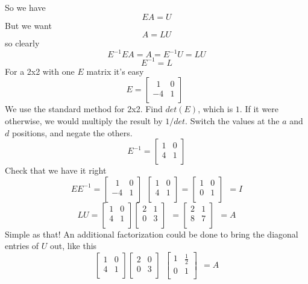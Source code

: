 \documentclass[11pt, oneside]{article}
\begin{document}
So we have 
\[ EA = U \]
But we want
\[ A = LU \]
so clearly 
\[ E^{-1}EA = A = E^{-1}U = LU \]
\[ E^{-1} = L \]
For a 2x2 with one $E$ matrix it's easy
\[ 
E  =
\begin{bmatrix} 
\ \   1  &  0  \\ 
  -4  &  1  \\
\end{bmatrix}  \ \ 
\]
We use the standard method for 2x2.  Find $det(E)$, which is $1$.  If it were otherwise, we would multiply the result by $1/det$.  Switch the values at the $a$ and $d$ positions, and negate the others.
\[ 
E^{-1} =
\begin{bmatrix} 
  1  &  0  \\ 
  4  &  1  \\
\end{bmatrix}
\]
Check that we have it right
\[ 
EE^{-1} =
\begin{bmatrix} 
\ \   1  &  0  \\ 
  -4  &  1  \\
\end{bmatrix}  \ \ 
\begin{bmatrix} 
  1  &  0  \\ 
  4  &  1  \\
\end{bmatrix}
=
\begin{bmatrix} 
  1  &  0  \\ 
  0  &  1  \\
\end{bmatrix}  \ \ 
= I
\]
\[ 
LU =
\begin{bmatrix} 
  1  &  0  \\ 
  4  &  1  \\
\end{bmatrix}
\begin{bmatrix} 
  2  &  1  \\ 
  0  &  3  \\
\end{bmatrix}  \ \ 
=
\begin{bmatrix} 
  2  &  1  \\ 
  8  &  7  \\
\end{bmatrix}  \ \ 
= A
\]
Simple as that! 
An additional factorization could be done to bring the diagonal entries of $U$ out, like this
\[
\begin{bmatrix} 
  1  &  0  \\ 
  4  &  1  \\
\end{bmatrix}
\begin{bmatrix} 
  2  &  0  \\ 
  0  &  3  \\
\end{bmatrix}  \ \ 
\begin{bmatrix} 
  1  &  \frac{1}{2}  \\ 
  0  &  1  \\
\end{bmatrix}  \ \ 
= A
\]
\end{document}
